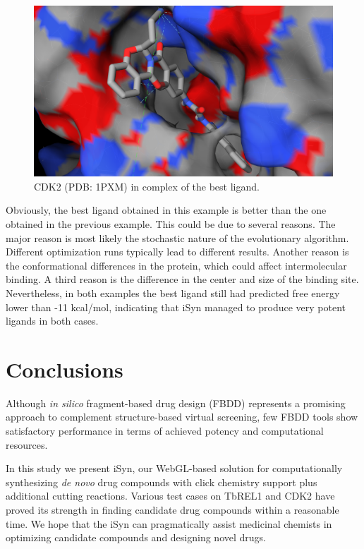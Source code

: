\begin{figure}
\begin{center}
\includegraphics[width=\linewidth]{../isyn/1PXM.png}
\end{center}
\caption{CDK2 (PDB: 1PXM) in complex of the best ligand.}
\label{isyn:1PXM}
\end{figure}

Obviously, the best ligand obtained in this example is better than the one obtained in the previous example. This could be due to several reasons. The major reason is most likely the stochastic nature of the evolutionary algorithm. Different optimization runs typically lead to different results. Another reason is the conformational differences in the protein, which could affect intermolecular binding. A third reason is the difference in the center and size of the binding site. Nevertheless, in both examples the best ligand still had predicted free energy lower than -11 kcal/mol, indicating that iSyn managed to produce very potent ligands in both cases.

\section{Conclusions}

Although \textit{in silico} fragment-based drug design (FBDD) represents a promising approach to complement structure-based virtual screening, few FBDD tools show satisfactory performance in terms of achieved potency and computational resources.

In this study we present iSyn, our WebGL-based solution for computationally synthesizing \textit{de novo} drug compounds with click chemistry support plus additional cutting reactions. Various test cases on TbREL1 and CDK2 have proved its strength in finding candidate drug compounds within a reasonable time. We hope that the iSyn can pragmatically assist medicinal chemists in optimizing candidate compounds and designing novel drugs.

